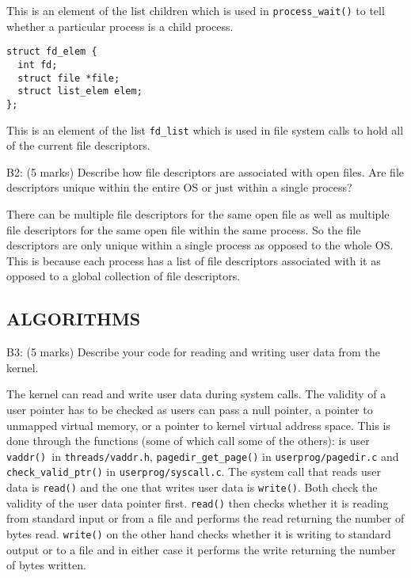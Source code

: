 This is an element of the list children which is used in \texttt{process\_wait()} to tell whether a particular process is a child process.

\begin{verbatim}
struct fd_elem {
  int fd;
  struct file *file;
  struct list_elem elem;
};
\end{verbatim}

This is an element of the list \texttt{fd\_list} which is used in file system calls to hold all of the current file descriptors.




\noindent B2: (5 marks)
Describe how file descriptors are associated with open files.
Are file descriptors unique within the entire OS or just within a
single process?


There can be multiple file descriptors for the same open file as well as multiple file descriptors for the same open file within the same process. So the file descriptors are only unique within a single process as opposed to the whole OS. This is because each process has a list of file descriptors associated with it as opposed to a global collection of file descriptors.


\subsection*{ALGORITHMS}

\noindent B3: (5 marks)
Describe your code for reading and writing user data from the
kernel.


The kernel can read and write user data during system calls. The validity of a user pointer has to be checked as users can pass a null pointer, a pointer to unmapped virtual memory, or a pointer to kernel virtual address space. This is done through the functions (some of which call some of the others): is user \texttt{vaddr() }in \texttt{threads/vaddr.h}, \texttt{pagedir\_get\_page()} in \texttt{userprog/pagedir.c} and \texttt{check\_valid\_ptr()} in \texttt{userprog/syscall.c}. The system call that reads user data is \texttt{read()} and the one that writes user data is \texttt{write()}. Both check the validity of the user data pointer first. \texttt{read()} then checks whether it is reading from standard input or from a file and performs the read returning the number of bytes read. \texttt{write()} on the other hand checks whether it is writing to standard output or to a file and in either case it performs the write returning the number of bytes written.

